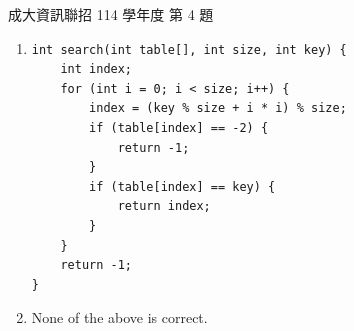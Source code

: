 \begin{pastexam}[label={px:ncku-114-prog-04}]{成大資訊聯招 114 學年度 第 4 題}
\begin{enumerate}[label=(\Alph*)]
\begin{verbatim}
        }
        if (table[index] == key) {
            return index;
        }
        if (table[index] == -2) {
            continue;
        }
    }
    return -1;
}
\end{verbatim}
\item \leavevmode
\begin{verbatim}
int search(int table[], int size, int key) {
    int index;
    for (int i = 0; i < size; i++) {
        index = (key % size + i * i) % size;
        if (table[index] == -2) {
            return -1;
        }
        if (table[index] == key) {
            return index;
        }
    }
    return -1;
}
\end{verbatim}
\item None of the above is correct.
\end{enumerate}
\end{pastexam}

